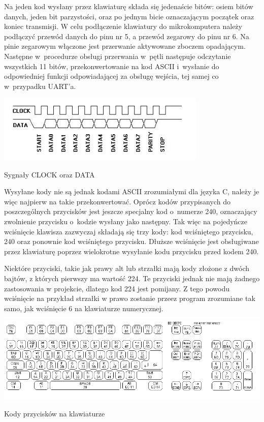 \documentclass[shortabstract]{iithesis}
\begin{document}
Na jeden kod wysłany przez klawiaturę składa się jedenaście bitów: osiem bitów danych, jeden bit parzystości, oraz po jednym bicie oznaczającym początek oraz koniec transmisji. W celu podłączenie klawiatury do mikrokomputera należy podłączyć przewód danych do pinu nr 5, a przewód zegarowy do pinu nr 6. Na pinie zegarowym włączone jest przerwanie aktywowane zboczem opadającym. Następne w~procedurze obsługi przerwania w~pętli następuje odczytanie wszystkich 11 bitów, przekonwertowanie na kod ASCII i~wysłanie do odpowiedniej funkcji odpowiadającej za obsługę wejścia, tej samej co w~przypadku UART'a.

\begingroup
\centering
\includegraphics[width=0.75\textwidth]{signals.png}
\captionsetup{type=figure}
\caption{Sygnały CLOCK oraz DATA}
\endgroup

Wysyłane kody nie są jednak kodami ASCII zrozumiałymi dla języka C, należy je więc najpierw na takie przekonwertować. Oprócz kodów przypisanych do poszczególnych przycisków jest jeszcze specjalny kod o~numerze 240, oznaczający zwolnienie przycisku o~kodzie wysłany jako następny. Tak więc na pojedyńcze wciśnięcie klawisza zazwyczaj składają się trzy kody: kod wciśniętego przycisku, 240 oraz ponownie kod wciśniętego przycisku. Dłuższe wciśnięcie jest obsługiwane przez klawiaturę poprzez wielokrotne wysyłanie kodu przycisku przed kodem 240.

Niektóre przyciski, takie jak prawy alt lub strzałki mają kody złożone z dwóch bajtów, z których pierwszy ma wartość 224. Te przyciski jednak nie mają żadnego zastosowania w projekcie, dlatego kod 224 jest pomijany. Z tego powodu wciśnięcie na przykład strzałki w prawo zostanie przeez program zrozumiane tak samo, jak wciśnięcie 6 na klawiaturze numerycznej.

\begingroup
\centering
\includegraphics[width=\textwidth]{scancode.png}
\captionsetup{type=figure}
\caption{Kody przycisków na klawiaturze}
\endgroup
\end{document}
